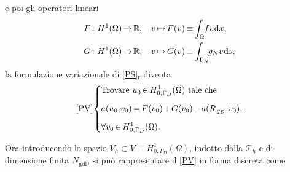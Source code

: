 \documentclass{article}
\newcommand{\de}{\mathrm{d}}
\newcommand{\Ngdl}{N_{\text{gdl}}}
\newcommand{\SpaziaturaMate}[3]{
    \setlength{\thinmuskip}{#1mu}
    \setlength{\medmuskip}{#2mu}
    \setlength{\thickmuskip}{#3mu}
}
\newcommand{\teqref}[2]{\hyperref[#1]{#2}}
\begin{document}
            e poi gli operatori lineari
            \begin{equation*}
                \setlength{\thinmuskip}{1mu}
                \setlength{\medmuskip}{2mu}
                \setlength{\thickmuskip}{3mu}
                \begin{aligned}
                    F:\ &H^1(\Omega)\rightarrow\mathbb R,\quad v\mapsto F(v)\equiv
                    \int_{\Omega}\!\!fv\, \de x,\\
                    G:\ &H^1(\Omega)\rightarrow\mathbb R,\quad v\mapsto G(v)\equiv
                    \int_{\Gamma_N}\!\!\!\!g_Nv\,\de s,
                \end{aligned}
                \label{eqOperatoreLinearePSVariazionale}
            \end{equation*}
            la formulazione variazionale di \teqref{eqPSRiformulato}{[PS]$_\text{r}$} diventa 
            \begin{equation}
                \setlength{\thinmuskip}{1mu}
                \setlength{\medmuskip}{2mu}
                \setlength{\thickmuskip}{3mu}
                \text{[PV]}
                \left\{
                \begin{aligned}
                    &\text{Trovare } u_0 \in H^1_{0,\Gamma_D}(\Omega) \text{ tale che}
                    \\[5pt]&a(u_0,v_0)=F(v_0)+G(v_0)-a(\mathcal R_{g_D},v_0),
                    \\[5pt]&\forall v_0\in H^1_{0,\Gamma_D}(\Omega).
                \end{aligned}
                \right.
                \label{eqPSVariazionale}
            \end{equation}
            {\SpaziaturaMate{1}{2}{3}
            Ora introducendo lo spazio $V_h\subset V\equiv H^1_{0,\Gamma_D}(\Omega)$, indotto dalla $\mathcal T_h$ e di dimensione finita $\Ngdl$, si può rappresentare il \teqref{eqPSVariazionale}{[PV]} in forma discreta come
            }
\end{document}
